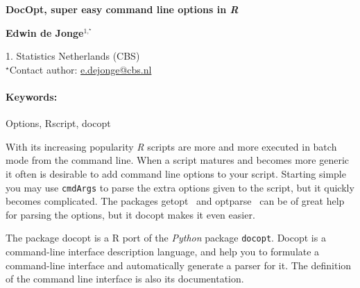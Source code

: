 \documentclass[11pt, a4paper]{article}
\newcommand{\pkg}[1]{{\normalfont\fontseries{b}\selectfont #1}}
\let\proglang=\textit
\let\code=\texttt
\renewcommand{\title}[1]{\begin{center}{\bf \LARGE #1}\end{center}}
\newcommand{\keywords}{\paragraph{Keywords:}}
\begin{document}
\pagestyle{empty}

\title{DocOpt, super easy command line options in \proglang{R}}

\begin{center}
  {\bf Edwin de Jonge$^{1,^\star}$}
\end{center}

\begin{affiliations}
1. Statistics Netherlands (CBS) \\[-2pt]
$^\star$Contact author: \href{mailto:e.dejonge@cbs.nl}{e.dejonge@cbs.nl}\\
\end{affiliations}

\keywords Options, Rscript, docopt

\vskip 0.8cm

With its increasing popularity \proglang{R} scripts are more and more executed in batch mode from the command line. 
When a script matures and becomes more generic it often is desirable to add command line options to 
your script. Starting simple you may use \code{cmdArgs} to parse the extra options given to the script, but it quickly 
becomes complicated. The packages \pkg{getopt}~\cite{getopt} and \pkg{optparse}~\cite{optparse} can be of great help for parsing the options, but it \pkg{docopt} makes it even easier.

The package \pkg{docopt} is a R port of the \proglang{Python} package \code{docopt}.
Docopt is a command-line interface description language, and help you to formulate a 
command-line interface and automatically generate a parser for it. 
The definition of the command line interface is also its documentation.






\nocite{docopt,van2007python}






\end{document}
